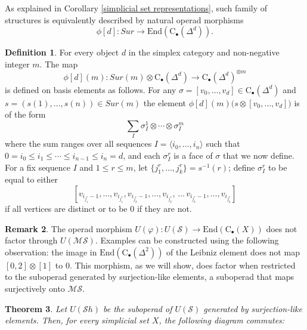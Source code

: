 \documentclass{amsart}
\renewcommand{\S}{\mathcal{S}}
\newcommand{\MS}{\mathcal{MS}}
\newcommand{\Sh}{\mathcal{S}h}
\newcommand{\chains}{\mathrm{C}_\bullet}
\newcommand{\tensor}{\otimes}
\newcommand{\End}{\mathrm{End}}
\newtheorem{theorem}{Theorem}
\theoremstyle{definition}
\newtheorem{definition}[theorem]{Definition}
\newtheorem{remark}[theorem]{Remark}
\begin{document}
	As explained in Corollary \ref{simplicial set representations}, such family of structures is equivalently described by natural operad morphisms
	\begin{equation*}
	\phi[d]:Sur \to \End(\chains(\Delta^d)).
	\end{equation*}
	
	\begin{definition} \label{coaction of Sur}
		For every object $d$ in the simplex category and non-negative integer $m$. The map 
		$$\phi[d](m):Sur(m)\tensor\chains(\Delta^d)\to\chains(\Delta^d)^{\tensor m}$$
		is defined on basis elements as follows. For any $\sigma=[v_0,\dots,v_d]\in\chains(\Delta^d)$ and $s=(s(1),\dots,s(n))\in Sur(m)$ the element $\phi[d](m)\big(s\tensor[v_0,\dots,v_d]\big)$ is of the form 
		\begin{equation}\label{sum after iterated coproduct}
		\sum_I\sigma^1_I\tensor\cdots\tensor\sigma^m_I
		\end{equation}
		where the sum ranges over all sequences $I=\langle i_0,\dots,i_n\rangle$ such that $0=i_0\leq i_1\leq\cdots\leq i_{n-1}\leq i_n=d$, and each $\sigma^r_I$ is a face of $\sigma$ that we now define. For a fix sequence $I$ and $1\leq r\leq m$, let $\{j_1^r,\dots,j^r_k\}=s^{-1}(r)$; define $\sigma_I^r$ to be equal to either 
		\begin{equation}\label{after join}
		[v_{i_{j^r_{1}}-1},\dots,v_{i_{j^r_{1}}},v_{i_{j^r_{2}}-1},\dots,v_{i_{j^r_{2}}},\,\dots\,v_{i_{j^r_{k}}-1},\dots,v_{i_{j^r_{k}}}]
		\end{equation} if all vertices are distinct or to be $0$ if they are not.
	\end{definition}
	
	\begin{remark}
		The operad morphism $U(\varphi) : U(\S) \to \End(\chains(X))$ does not factor through $U(\MS)$. Examples can be constructed using the following observation: the image in $\End(\chains(\Delta^2))$ of the Leibniz element does not map $[0,2]\tensor[1]$ to $0$. This morphism, as we will show, does factor when restricted to the suboperad generated by surjection-like elements, a suboperad that maps surjectively onto $\MS$.
	\end{remark}
	
	\begin{theorem} \label{Representations of MS and Sur on simplicial sets}
		Let $U(\Sh)$ be the suboperad of $U(\S)$ generated by surjection-like elements. Then, for every simplicial set $X$, the following diagram commutes:
		\begin{center}
		\end{center}
	\end{theorem}
	
\end{document}
